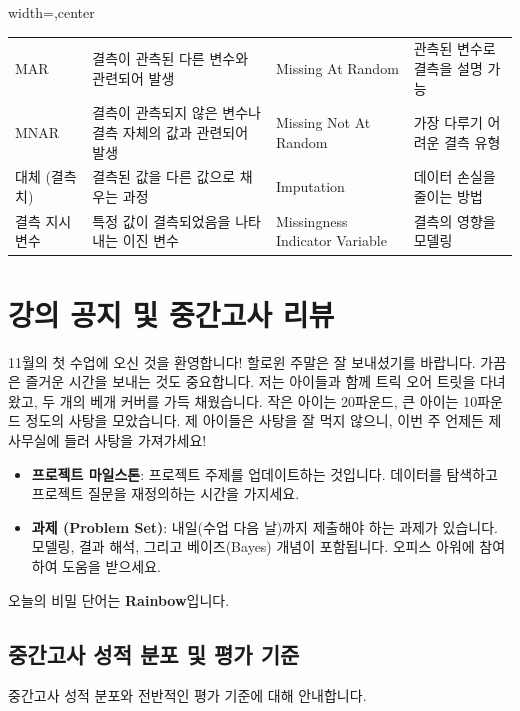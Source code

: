 \documentclass[11pt,a4paper]{book}
\providecommand{\newsection}{\section}
\theoremstyle{definition}
\begin{document}
\begin{adjustbox}{width=\textwidth,center}
\begin{tabular}{llll}
MAR & 결측이 관측된 다른 변수와 관련되어 발생 & Missing At Random & 관측된 변수로 결측을 설명 가능 \\
MNAR & 결측이 관측되지 않은 변수나 결측 자체의 값과 관련되어 발생 & Missing Not At Random & 가장 다루기 어려운 결측 유형 \\
대체 (결측치) & 결측된 값을 다른 값으로 채우는 과정 & Imputation & 데이터 손실을 줄이는 방법 \\
결측 지시 변수 & 특정 값이 결측되었음을 나타내는 이진 변수 & Missingness Indicator Variable & 결측의 영향을 모델링 \\
\bottomrule
\end{tabular}
\end{adjustbox}

\newsection{강의 공지 및 중간고사 리뷰}

\begin{infobox}[title=11월 첫 수업 공지]
11월의 첫 수업에 오신 것을 환영합니다! 할로윈 주말은 잘 보내셨기를 바랍니다.
가끔은 즐거운 시간을 보내는 것도 중요합니다. 저는 아이들과 함께 트릭 오어 트릿을 다녀왔고, 두 개의 베개 커버를 가득 채웠습니다.
작은 아이는 20파운드, 큰 아이는 10파운드 정도의 사탕을 모았습니다.
제 아이들은 사탕을 잘 먹지 않으니, 이번 주 언제든 제 사무실에 들러 사탕을 가져가세요!
\end{infobox}

\begin{infobox}[title=이번 주 마감 기한]
\begin{itemize}
    \item \textbf{프로젝트 마일스톤}: 프로젝트 주제를 업데이트하는 것입니다. 데이터를 탐색하고 프로젝트 질문을 재정의하는 시간을 가지세요.
    \item \textbf{과제 (Problem Set)}: 내일(수업 다음 날)까지 제출해야 하는 과제가 있습니다. 모델링, 결과 해석, 그리고 베이즈(Bayes) 개념이 포함됩니다. 오피스 아워에 참여하여 도움을 받으세요.
\end{itemize}
\end{infobox}

\begin{tcolorbox}[infobox, title={강의 중 언급: 오늘의 비밀 단어}]
오늘의 비밀 단어는 \textbf{Rainbow}입니다.
\end{tcolorbox}

\subsection*{중간고사 성적 분포 및 평가 기준}
중간고사 성적 분포와 전반적인 평가 기준에 대해 안내합니다.
\end{document}
